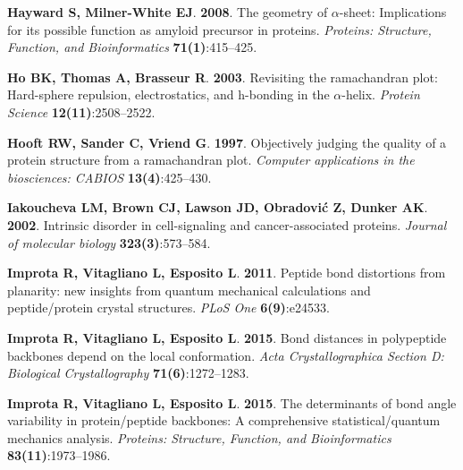 \documentclass[fleqn,10pt,lineno]{wlpeerj} %
\begin{document}
\begin{thebibliography}{58}
\textbf{Hayward S, Milner-White EJ}. \textbf{2008}.
\newblock The geometry of $\alpha$-sheet: Implications for its possible
  function as amyloid precursor in proteins.
\newblock \emph{Proteins: Structure, Function, and Bioinformatics}
  \textbf{71(1)}:415--425.

\textbf{Ho BK, Thomas A, Brasseur R}. \textbf{2003}.
\newblock Revisiting the ramachandran plot: Hard-sphere repulsion,
  electrostatics, and h-bonding in the $\alpha$-helix.
\newblock \emph{Protein Science} \textbf{12(11)}:2508--2522.

\textbf{Hooft RW, Sander C, Vriend G}. \textbf{1997}.
\newblock Objectively judging the quality of a protein structure from a
  ramachandran plot.
\newblock \emph{Computer applications in the biosciences: CABIOS}
  \textbf{13(4)}:425--430.

\textbf{Iakoucheva LM, Brown CJ, Lawson JD, Obradovi{\'c} Z, Dunker AK}.
  \textbf{2002}.
\newblock Intrinsic disorder in cell-signaling and cancer-associated proteins.
\newblock \emph{Journal of molecular biology} \textbf{323(3)}:573--584.

\textbf{Improta R, Vitagliano L, Esposito L}. \textbf{2011}.
\newblock Peptide bond distortions from planarity: new insights from quantum
  mechanical calculations and peptide/protein crystal structures.
\newblock \emph{PLoS One} \textbf{6(9)}:e24533.

\textbf{Improta R, Vitagliano L, Esposito L}. \textbf{2015}{}.
\newblock Bond distances in polypeptide backbones depend on the local
  conformation.
\newblock \emph{Acta Crystallographica Section D: Biological Crystallography}
  \textbf{71(6)}:1272--1283.

\textbf{Improta R, Vitagliano L, Esposito L}. \textbf{2015}{}.
\newblock The determinants of bond angle variability in protein/peptide
  backbones: A comprehensive statistical/quantum mechanics analysis.
\newblock \emph{Proteins: Structure, Function, and Bioinformatics}
  \textbf{83(11)}:1973--1986.


\end{thebibliography}
\end{document}
